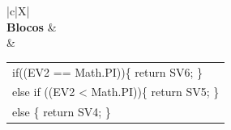 \begin{xltabular}{\textwidth}{|c|X|}
 \\ \hline
\textbf{Blocos} &  \\ \hline
{} & \begin{tabular}[c]{@{}l@{}}if((EV2 == Math.PI))\{   return SV6; \}\\ else if ((EV2 < Math.PI))\{   return SV5; \}\\ else \{   return SV4; \} \end{tabular}  \\ \hline	


\end{xltabular}
